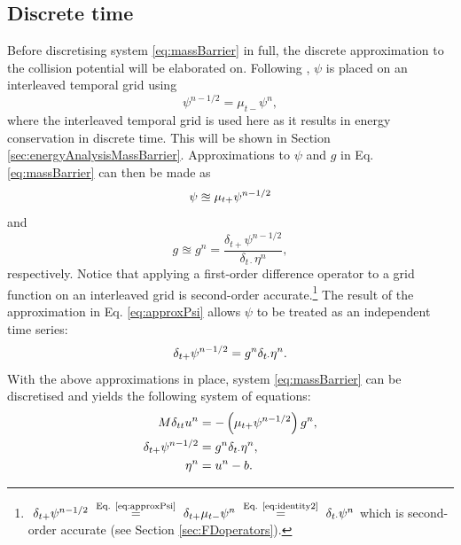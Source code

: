 \subsection{Discrete time}
Before discretising system \eqref{eq:massBarrier} in full, the discrete approximation to the collision potential will be elaborated on.
Following \cite{Ducceschi2021}, $\psi$ is placed on an interleaved temporal grid using
\begin{equation}
    \psi^{n-1/2} = \mu_{t-}\psi^n,
\end{equation} 
where the interleaved temporal grid is used here as it results in energy conservation in discrete time. This will be shown in Section \ref{sec:energyAnalysisMassBarrier}. Approximations to $\psi$ and $g$ in Eq. \eqref{eq:massBarrier} can then be made as 
\begin{equation}
    \psi \approxeq \mu_{t+} \psi^{n-1/2}
\end{equation}
and 
\begin{equation}\label{eq:approxPsi}
    g \approxeq g^n = \frac{\delta_{t+}\psi^{n-1/2}}{\delta_{t\cdot}\eta^n} ,
\end{equation}
respectively. Notice that applying a first-order difference operator to a grid function on an interleaved grid is second-order accurate.\footnote{$\ \dtp \psi^{n-1/2}\ \overset{\text{Eq. \eqref{eq:approxPsi}}}{=}\ \dtp \mtm \psi^n\ \overset{\text{Eq. \eqref{eq:identity2}}}{=}\  \dtd \psi^n$ which is second-order accurate (see Section \ref{sec:FDoperators}).}
The result of the approximation in Eq. \eqref{eq:approxPsi} allows $\psi$ to be treated as an independent time series:
\begin{equation}
    \delta_{t+} \psi^{n-1/2} = g^n \delta_{t\cdot} \eta^n.
\end{equation}
With the above approximations in place, system \eqref{eq:massBarrier} can be discretised and yields the following system of equations: 
\begin{subequations}\label{eq:massBarrierSystem}
    \begin{align}
        M\delta_{tt} u^n &= -\left(\mu_{t+}\psi^{n-1/2}\right)g^n,\label{eq:massBarrierSystem1}\\
        \delta_{t+} \psi^{n-1/2} &= g^n \delta_{t\cdot} \eta^n,\label{eq:massBarrierSystem2}\\ 
        \eta^n &= u^n - b.\label{eq:massBarrierSystem3}
    \end{align}
\end{subequations}


